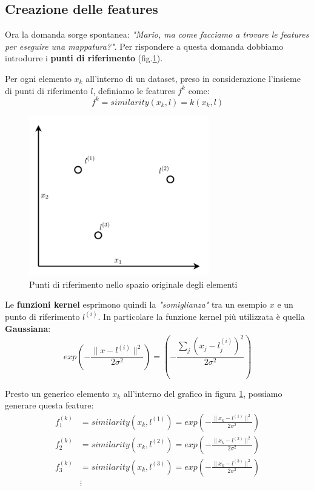 \subsection{Creazione delle features}
Ora la domanda sorge spontanea: \textit{"Mario, ma come facciamo a trovare le features per eseguire una mappatura?"}. Per rispondere a questa domanda dobbiamo introdurre i \textbf{punti di riferimento} (fig.\ref{fig:supportVector}). 
\begin{definizione}
  Per ogni elemento $x_k$ all'interno di un dataset, preso in considerazione l'insieme di punti di riferimento $l$, definiamo le features $f^k$ come:
  \[f^k = similarity(x_k,l) = k(x_k,l)\]
\end{definizione}
\begin{figure}[H]
    \centering
    \includegraphics[width=0.7\textwidth]{img/fig-9-svm-landmarks.png}
    \caption{Punti di riferimento nello spazio originale degli elementi}
    \label{fig:supportVector}
\end{figure}
Le \textbf{funzioni kernel} esprimono quindi la \textit{"somiglianza"} tra un esempio $x$ e un punto di riferimento $l^{(i)}$. In particolare la funzione kernel più utilizzata è quella \textbf{Gaussiana}:
  \[ exp\left(-\frac{\lVert x - l^{(i)}\lVert^2}{2\sigma^2}\right) = \left(-\frac{\sum_j(x_j-l_j^{(i)})^2}{2\sigma^2}\right)\]
  \begin{esempio}
  Presto un generico elemento $x_k$ all'interno del grafico in figura \ref{fig:supportVector}, possiamo generare questa feature:
  \begin{align*}
f_1^{(k)} &= similarity(x_k, l^{(1)}) = exp \left(- \frac {\lVert x_k - l^{(1)} \rVert^2} {2 \sigma^2} \right) \\
f_2^{(k)} &= similarity(x_k, l^{(2)}) = exp \left(- \frac {\lVert x_k - l^{(2)} \rVert^2} {2 \sigma^2} \right) \\
f_3^{(k)} &= similarity(x_k, l^{(3)}) = exp \left(- \frac {\lVert x_k - l^{(3)} \rVert^2} {2 \sigma^2} \right) \\
    & \vdots
\end{align*}
\end{esempio}

